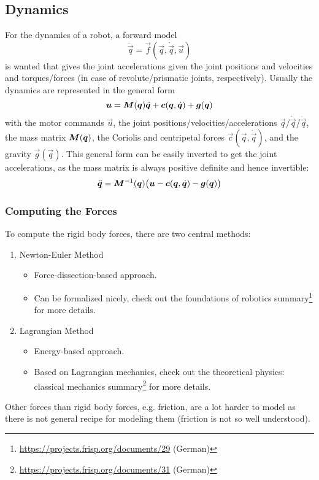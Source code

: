 		\subsection{Dynamics}
			For the dynamics of a robot, a forward model
			\begin{equation*}
				\ddot{\vec{q}} = \vec{f}(\vec{q}, \dot{\vec{q}}, \vec{u})
			\end{equation*}
			is wanted that gives the joint accelerations given the joint positions and velocities and torques/forces (in case of revolute/prismatic joints, respectively). Usually the dynamics are represented in the general form
			\begin{equation}
				\bm{u} = \bm{M}(\bm{q}) \ddot{\bm{q}} + \bm{c}(\bm{q}, \dot{\bm{q}}) + \bm{g}(\bm{q})  \label{eq:dynamicsInverseGeneral}
			\end{equation}
			with the motor commands \(\vec{u}\), the joint positions/velocities/accelerations \(\vec{q}\)/\(\dot{\vec{q}}\)/\(\ddot{\vec{q}}\), the mass matrix \(\bm{M}(\bm{q})\), the Coriolis and centripetal forces \(\vec{c}(\vec{q}, \dot{\vec{q}})\), and the gravity \(\vec{g}(\vec{q})\). This general form can be easily inverted to get the joint accelerations, as the mass matrix is always positive definite and hence invertible:
			\begin{equation}
				\ddot{\bm{q}} = \bm{M}^{-1}(\bm{q}) \big( \bm{u} - \bm{c}(\bm{q}, \dot{\bm{q}}) - \bm{g}(\bm{q}) \big)  \label{eq:dynamicsGeneral}
			\end{equation}

			\subsubsection{Computing the Forces}
				\label{subsubsec:robotsDynamics}

				To compute the rigid body forces, there are two central methods:
				\begin{enumerate}
					\item Newton-Euler Method
						\begin{itemize}
							\item Force-dissection-based approach.
							\item Can be formalized nicely, check out the foundations of robotics summary\footnote{\url{https://projects.frisp.org/documents/29} (German)} for more details.
						\end{itemize}
					\item Lagrangian Method
						\begin{itemize}
							\item Energy-based approach.
							\item Based on Lagrangian mechanics, check out the theoretical physics: classical mechanics summary\footnote{\url{https://projects.frisp.org/documents/31} (German)} for more details.
						\end{itemize}
				\end{enumerate}
				Other forces than rigid body forces, e.g. friction, are a lot harder to model as there is not general recipe for modeling them (friction is not so well understood).

